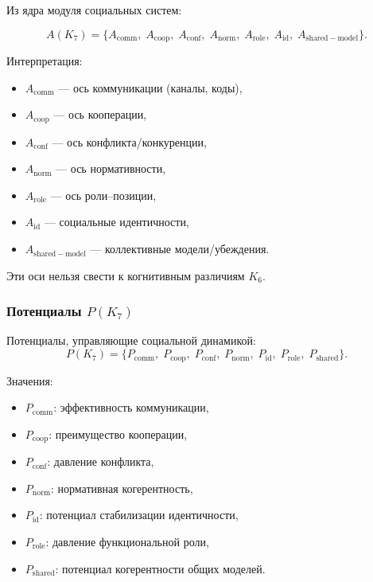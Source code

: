 Из ядра модуля социальных систем:

\[
A(K_7)=
\{
A_{\mathrm{comm}},\;
A_{\mathrm{coop}},\;
A_{\mathrm{conf}},\;
A_{\mathrm{norm}},\;
A_{\mathrm{role}},\;
A_{\mathrm{id}},\;
A_{\mathrm{shared-model}}
\}.
\]

Интерпретация:
\begin{itemize}
    \item $A_{\mathrm{comm}}$ — ось коммуникации (каналы, коды),
    \item $A_{\mathrm{coop}}$ — ось кооперации,
    \item $A_{\mathrm{conf}}$ — ось конфликта/конкуренции,
    \item $A_{\mathrm{norm}}$ — ось нормативности,
    \item $A_{\mathrm{role}}$ — ось роли–позиции,
    \item $A_{\mathrm{id}}$ — социальные идентичности,
    \item $A_{\mathrm{shared-model}}$ — коллективные модели/убеждения.
\end{itemize}

Эти оси нельзя свести к когнитивным различиям $K_6$.

\subsubsection{Потенциалы \texorpdfstring{$P(K_7)$}{P(K_7)}}

Потенциалы, управляющие социальной динамикой:
\[
P(K_7)=
\{
P_{\mathrm{comm}},\;
P_{\mathrm{coop}},\;
P_{\mathrm{conf}},\;
P_{\mathrm{norm}},\;
P_{\mathrm{id}},\;
P_{\mathrm{role}},\;
P_{\mathrm{shared}}
\}.
\]

Значения:
\begin{itemize}
    \item $P_{\mathrm{comm}}$: эффективность коммуникации,
    \item $P_{\mathrm{coop}}$: преимущество кооперации,
    \item $P_{\mathrm{conf}}$: давление конфликта,
    \item $P_{\mathrm{norm}}$: нормативная когерентность,
    \item $P_{\mathrm{id}}$: потенциал стабилизации идентичности,
    \item $P_{\mathrm{role}}$: давление функциональной роли,
    \item $P_{\mathrm{shared}}$: потенциал когерентности общих моделей.
\end{itemize}

